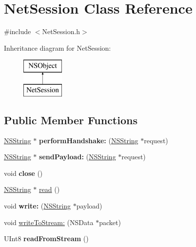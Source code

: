 \hypertarget{interface_net_session}{
\section{\-Net\-Session \-Class \-Reference}
\label{interface_net_session}
}


{\ttfamily \#include $<$\-Net\-Session.\-h$>$}

\-Inheritance diagram for \-Net\-Session\-:\begin{figure}[H]
\begin{center}
\leavevmode
\includegraphics[height=2.000000cm]{interface_net_session}
\end{center}
\end{figure}
\subsection*{\-Public \-Member \-Functions}
\begin{DoxyCompactItemize}
\item 
\hypertarget{interface_net_session_a7bb9c333fa4588528843d2577984499c}{
\hyperlink{class_n_s_string}{\-N\-S\-String} $\ast$ {\bfseries perform\-Handshake\-:} (\hyperlink{class_n_s_string}{\-N\-S\-String} $\ast$request)}
\label{interface_net_session_a7bb9c333fa4588528843d2577984499c}

\item 
\hypertarget{interface_net_session_a3a71529897ca966e9f9eb7777bd1075d}{
\hyperlink{class_n_s_string}{\-N\-S\-String} $\ast$ {\bfseries send\-Payload\-:} (\hyperlink{class_n_s_string}{\-N\-S\-String} $\ast$request)}
\label{interface_net_session_a3a71529897ca966e9f9eb7777bd1075d}

\item 
\hypertarget{interface_net_session_a997806e3229ba5a4f614053f6e1b79ce}{
void {\bfseries close} ()}
\label{interface_net_session_a997806e3229ba5a4f614053f6e1b79ce}

\item 
\hyperlink{class_n_s_string}{\-N\-S\-String} $\ast$ \hyperlink{interface_net_session_a1834606353ba4a13102346ce6810ffc1}{read} ()
\item 
\hypertarget{interface_net_session_a37df3e8f8d7f99adc56256cdf0b99984}{
void {\bfseries write\-:} (\hyperlink{class_n_s_string}{\-N\-S\-String} $\ast$payload)}
\label{interface_net_session_a37df3e8f8d7f99adc56256cdf0b99984}

\item 
void \hyperlink{interface_net_session_a403322c5ba3f458326bb8e2913e9f0e7}{write\-To\-Stream\-:} (\-N\-S\-Data $\ast$packet)
\item 
\hypertarget{interface_net_session_a836f798472a4526bf64de4fcf9a34433}{
\-U\-Int8 {\bfseries read\-From\-Stream} ()}
\label{interface_net_session_a836f798472a4526bf64de4fcf9a34433}

\end{DoxyCompactItemize}
